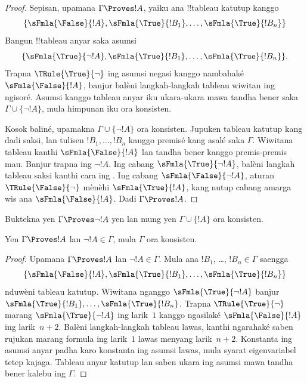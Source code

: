 \documentclass[../../../include/open-logic-section]{subfiles}
\begin{document}
\begin{proof}
Sepisan, upamana $\Gamma \Proves !A$, yaiku ana
!!{tableau} katutup kanggo
\[
\{\sFmla{\False}{!A},
\sFmla{\True}{!B_1}, \dots, \sFmla{\True}{!B_n}\}
\]
Bangun !!{tableau} anyar saka asumsi
\[
\{\sFmla{\True}{\lnot !A},
\sFmla{\True}{!B_1}, \dots, \sFmla{\True}{!B_n}\}.
\]
Trapna $\TRule{\True}{\lnot}$ ing asumsi negasi kanggo nambahaké
$\sFmla{\False}{!A}$, banjur balèni langkah-langkah tableau wiwitan ing ngisoré. Asumsi
kanggo tableau anyar iku ukara-ukara mawa tandha bener saka
$\Gamma \cup \{\lnot !A\}$, mula himpunan iku ora konsisten.

Kosok baliné, upamakna $\Gamma \cup \{\lnot !A\}$ ora konsisten.
Jupuken tableau katutup kang dadi saksi, lan tulisen $!B_1,\dots,!B_n$
kanggo premisé kang asalé saka $\Gamma$. Wiwitana tableau kanthi
$\sFmla{\False}{!A}$ lan tandha bener kanggo premis-premis mau.
Banjur trapna \Cut{} ing $\lnot !A$. Ing cabang $\sFmla{\True}{\lnot !A}$,
balèni langkah tableau saksi kanthi cara ing .
Ing cabang $\sFmla{\False}{\lnot !A}$, aturan $\TRule{\False}{\lnot}$
mènèhi $\sFmla{\True}{!A}$, kang nutup cabang amarga wis ana
$\sFmla{\False}{!A}$. Dadi $\Gamma \Proves !A$.
\end{proof}

\begin{prob}
Buktekna yen $\Gamma \Proves \lnot !A$ yen lan mung yen $\Gamma \cup
\{!A\}$ ora konsisten.
\end{prob}

\begin{prop}
  Yen $\Gamma \Proves !A$ lan $\lnot !A \in \Gamma$, mula $\Gamma$
  ora konsisten.
\end{prop}

\begin{proof}
  Upamana $\Gamma \Proves !A$ lan $\lnot !A \in \Gamma$. Mula ana
  $!B_1$, \dots, $!B_n \in \Gamma$ saengga
  \[
  \{\sFmla{\False}{!A}, \sFmla{\True}{!B_1}, \dots, \sFmla{\True}{!B_n}\}
  \]
  nduwèni tableau katutup. Wiwitana nganggo $\sFmla{\True}{\lnot !A}$
  banjur $\sFmla{\True}{!B_1},\dots,\sFmla{\True}{!B_n}$.
  Trapna $\TRule{\True}{\lnot}$ marang $\sFmla{\True}{\lnot !A}$ ing larik~$1$
  kanggo ngasilaké $\sFmla{\False}{!A}$ ing larik~$n+2$. Balèni
  langkah-langkah tableau lawas, kanthi ngarahaké saben rujukan
  marang formula ing larik~$1$ lawas menyang larik~$n+2$.
  Konstanta ing asumsi anyar padha karo konstanta ing asumsi lawas,
  mula syarat eigenvariabel tetep kajaga. Tableau anyar katutup lan
  saben ukara ing asumsi mawa tandha bener kalebu ing $\Gamma$.
\end{proof}
\end{document}
